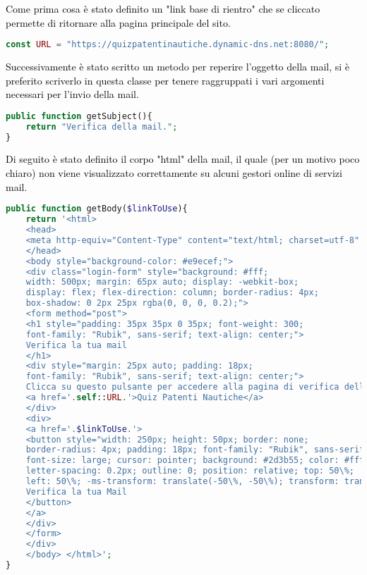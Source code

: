 \raggedright
\textcolor{black}{Come prima cosa è stato definito un "link base di rientro" che se cliccato permette di ritornare alla pagina principale del sito.}\\

 \begin{lstlisting}[language=php]
	const URL = "https://quizpatentinautiche.dynamic-dns.net:8080/";
 \end{lstlisting}
 
 \raggedright
  \textcolor{black}{Successivamente è stato scritto un metodo per reperire l'oggetto della mail, si è preferito scriverlo in questa classe per tenere raggruppati i vari argomenti necessari per l'invio della mail.}\\
 
\begin{lstlisting}[language=php]
public function getSubject(){
	return "Verifica della mail.";
}
\end{lstlisting}

\raggedright
\textcolor{black}{Di seguito è stato definito il corpo "html" della mail, il quale (per un motivo poco chiaro) non viene visualizzato correttamente su alcuni gestori online di servizi mail. }\\

\begin{lstlisting}[language=php]
public function getBody($linkToUse){
	return '<html>
	<head>
	<meta http-equiv="Content-Type" content="text/html; charset=utf-8" />
	</head>
	<body style="background-color: #e9ecef;">
	<div class="login-form" style="background: #fff;
	width: 500px; margin: 65px auto; display: -webkit-box;
	display: flex; flex-direction: column; border-radius: 4px;
	box-shadow: 0 2px 25px rgba(0, 0, 0, 0.2);">
	<form method="post">
	<h1 style="padding: 35px 35px 0 35px; font-weight: 300;
	font-family: "Rubik", sans-serif; text-align: center;">
	Verifica la tua mail
	</h1>
	<div style="margin: 25px auto; padding: 18px;
	font-family: "Rubik", sans-serif; text-align: center;">
	Clicca su questo pulsante per accedere alla pagina di verifica della mail inserita su:
	<a href='.self::URL.'>Quiz Patenti Nautiche</a>
	</div>
	<div>
	<a href='.$linkToUse.'>
	<button style="width: 250px; height: 50px; border: none;
	border-radius: 4px; padding: 18px; font-family: "Rubik", sans-serif;
	font-size: large; cursor: pointer; background: #2d3b55; color: #fff;
	letter-spacing: 0.2px; outline: 0; position: relative; top: 50\%;
	left: 50\%; -ms-transform: translate(-50\%, -50\%); transform: translate(-50\%, -50\%);">
	Verifica la tua Mail
	</button>
	</a>
	</div>
	</form>
	</div>
	</body>	</html>';
}
 \end{lstlisting}
 
